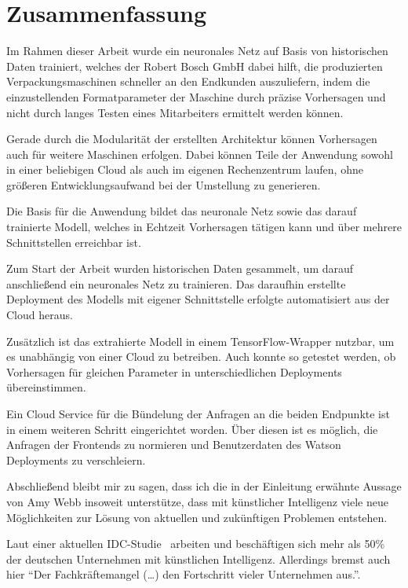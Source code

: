 \chapter{Zusammenfassung}
\label{ch:zusammenfassung}
Im Rahmen dieser Arbeit wurde ein neuronales Netz auf Basis von historischen Daten trainiert, welches der Robert Bosch
GmbH dabei hilft, die produzierten Verpackungsmaschinen schneller an den Endkunden auszuliefern, indem die
einzustellenden Formatparameter der Maschine durch präzise Vorhersagen und nicht durch langes Testen eines Mitarbeiters
ermittelt werden können.

Gerade durch die Modularität der erstellten Architektur können Vorhersagen auch für weitere Maschinen erfolgen. Dabei
können Teile der Anwendung sowohl in einer beliebigen Cloud als auch im eigenen Rechenzentrum laufen, ohne größeren
Entwicklungsaufwand bei der Umstellung zu generieren.

Die Basis für die Anwendung bildet das neuronale Netz sowie das darauf trainierte Modell, welches in Echtzeit
Vorhersagen tätigen kann und über mehrere Schnittstellen erreichbar ist.

Zum Start der Arbeit wurden historischen Daten gesammelt, um darauf anschließend ein neuronales Netz zu trainieren. Das
daraufhin erstellte Deployment des Modells mit eigener Schnittstelle erfolgte automatisiert aus der Cloud heraus.

Zusätzlich ist das extrahierte Modell in einem TensorFlow-Wrapper nutzbar, um es unabhängig von einer Cloud zu
betreiben. Auch konnte so getestet werden, ob Vorhersagen für gleichen Parameter in unterschiedlichen Deployments
übereinstimmen.

Ein Cloud Service für die Bündelung der Anfragen an die beiden Endpunkte ist in einem weiteren Schritt eingerichtet
worden. Über diesen ist es möglich, die Anfragen der Frontends zu normieren und Benutzerdaten des Watson Deployments zu
verschleiern.

Abschließend bleibt mir zu sagen, dass ich die in der Einleitung erwähnte Aussage von Amy Webb insoweit unterstütze,
dass mit künstlicher Intelligenz viele neue Möglichkeiten zur Lösung von aktuellen und zukünftigen Problemen entstehen.

Laut einer aktuellen IDC-Studie~\cite{article_zusammenfassung_idc} arbeiten und beschäftigen sich mehr als 50\% der
deutschen Unternehmen mit künstlichen Intelligenz. Allerdings bremst auch hier \enquote{Der Fachkräftemangel (\ldots)
den Fortschritt vieler Unternehmen aus.}.
